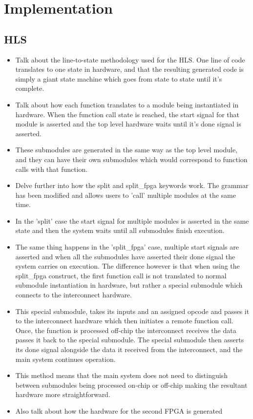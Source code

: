 \chapter{Implementation}

\section{HLS}

\begin{itemize}
    \item Talk about the line-to-state methodology used for the HLS. One line of code translates to one state in hardware, and that the resulting generated code is simply a giant state machine which goes from state to state until it's complete.
    \item Talk about how each function translates to a module being instantiated in hardware. When the function call state is reached, the start signal for that module is asserted and the top level hardware waits until it's done signal is asserted.
    \item These submodules are generated in the same way as the top level module, and they can have their own submodules which would correspond to function calls with that function.
    \item Delve further into how the split and split_fpga keywords work. The grammar has been modified and allows users to 'call' multiple modules at the same time.
    \item In the 'split' case the start signal for multiple modules is asserted in the same state and then the system waits until all submodules finish execution.
    \item The same thing happens in the 'split_fpga' case, multiple start signals are asserted and when all the submodules have asserted their done signal the system carries on execution. The difference however is that when using the split_fpga construct, the first function call is not translated to normal submodule instantiation in hardware, but rather a special submodule which connects to the interconnect hardware.
    \item This special submodule, takes its inputs and an assigned opcode and passes it to the interconnect hardware which then initiates a remote function call. Once, the function is processed off-chip the interconnect receives the data passes it back to the special submodule. The special submodule then asserts its done signal alongside the data it received from the interconnect, and the main system continues operation.
    \item This method means that the main system does not need to distinguish between submodules being processed on-chip or off-chip making the resultant hardware more straightforward.
    \item Also talk about how the hardware for the second FPGA is generated
\end{itemize}


